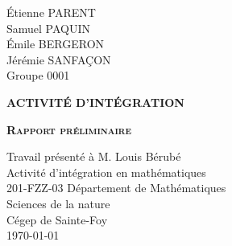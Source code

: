 \documentclass[12pt,letterpaper]{report}
\begin{document}
\begin{titlepage}
    \noindent
    Étienne PARENT\\
    Samuel PAQUIN \\
    Émile BERGERON\\
    Jérémie SANFAÇON\\
    \noindent
    Groupe 0001


    \indent
	\centering
	\vspace{2cm}

	{\scshape\textbf{ACTIVITÉ D'INTÉGRATION}}\\
	{\scshape\textbf{Rapport préliminaire}\par}
	\vspace{2cm}
	{Travail présenté à M.  Louis Bérubé}\\
	\vspace{2cm}
	{Activité d'intégration en mathématiques}\\
    {201-FZZ-03}
	\vfill
	{Département de Mathématiques}\\
	{Sciences de la nature}\\
	{Cégep de Sainte-Foy}\\
	{\large \today}
\end{titlepage}
\end{document}
